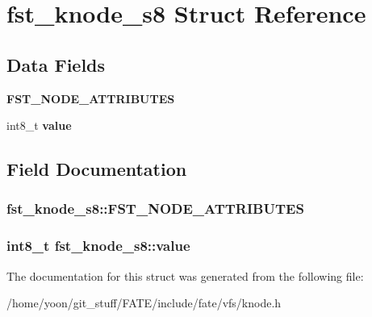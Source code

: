 \hypertarget{structfst__knode__s8}{\section{fst\-\_\-knode\-\_\-s8 Struct Reference}
\label{structfst__knode__s8}
}
\subsection*{Data Fields}
\begin{DoxyCompactItemize}
\item 
\hypertarget{structfst__knode__s8_aa10391903563b22a7b1fc553726741d3}{{\bfseries F\-S\-T\-\_\-\-N\-O\-D\-E\-\_\-\-A\-T\-T\-R\-I\-B\-U\-T\-E\-S}}\label{structfst__knode__s8_aa10391903563b22a7b1fc553726741d3}

\item 
\hypertarget{structfst__knode__s8_a5eae8363f77981b675d1c086592e1449}{int8\-\_\-t {\bfseries value}}\label{structfst__knode__s8_a5eae8363f77981b675d1c086592e1449}

\end{DoxyCompactItemize}


\subsection{Field Documentation}
\hypertarget{structfst__knode__s8_aa10391903563b22a7b1fc553726741d3}{
\subsubsection[{F\-S\-T\-\_\-\-N\-O\-D\-E\-\_\-\-A\-T\-T\-R\-I\-B\-U\-T\-E\-S}]{\setlength{\rightskip}{0pt plus 5cm}fst\-\_\-knode\-\_\-s8\-::\-F\-S\-T\-\_\-\-N\-O\-D\-E\-\_\-\-A\-T\-T\-R\-I\-B\-U\-T\-E\-S}}\label{structfst__knode__s8_aa10391903563b22a7b1fc553726741d3}
\hypertarget{structfst__knode__s8_a5eae8363f77981b675d1c086592e1449}{
\subsubsection[{value}]{\setlength{\rightskip}{0pt plus 5cm}int8\-\_\-t fst\-\_\-knode\-\_\-s8\-::value}}\label{structfst__knode__s8_a5eae8363f77981b675d1c086592e1449}


The documentation for this struct was generated from the following file\-:\begin{DoxyCompactItemize}
\item 
/home/yoon/git\-\_\-stuff/\-F\-A\-T\-E/include/fate/vfs/knode.\-h\end{DoxyCompactItemize}
